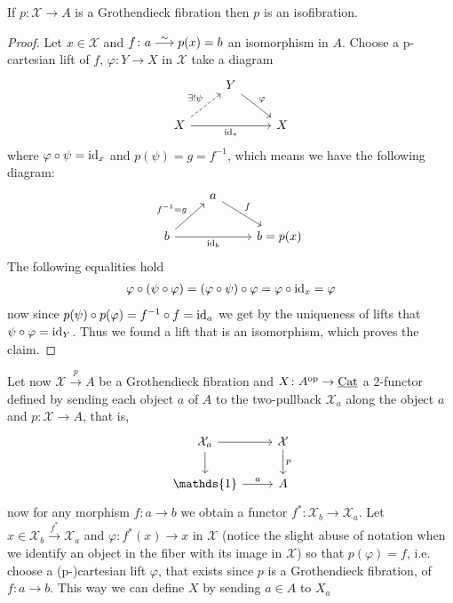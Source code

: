 \begin{lem}
	If $ p \colon \mathcal{ X } \to A $ is a Grothendieck fibration then $ p $ is an isofibration.
\end{lem}

\begin{proof}
	Let $ x \in \mathcal{ X } $ and $ f \colon a \isomorphism p ( x ) = b $ an isomorphism in $ A $.
	Choose a p-cartesian lift of $ f $, $ \varphi \colon Y \to X $ in $ \mathcal{ X } $ take a diagram 
	\[
	\begin{tikzcd}
		&
		Y
		\ar[rd, " \varphi "]
		\\
		X
		\ar[ru, dashed, " \exists ! \psi "]
		\ar[rr, " \id_* "']
		&&
		X
	\end{tikzcd}
	\]
	where $ \varphi \circ \psi = \operatorname{id}_x $ and $ p ( \psi ) = g = f^{-1} $, which means we have the following diagram: 
	\[
	\begin{tikzcd}
		&
		a 
		\ar[rd, " f "]
		\\
		b
		\ar[ru, " f^{ - 1 } = g "]
		\ar[rr, " \id_b"']
		&&
		b = p ( x )
	\end{tikzcd}	
	\]
	The following equalities hold 
	\begin{align*}
		\varphi \circ ( \psi \circ \varphi ) = ( \varphi \circ \psi ) \circ \varphi = \varphi \circ \operatorname{id}_x = \varphi 
	\end{align*}
	now since $ p ( \psi ) \circ p ( \varphi ) =  f^{ - 1 } \circ f = \operatorname{id}_a $
	we get by the uniqueness of lifts that $ \psi \circ \varphi = \operatorname{id}_Y $.
	Thus we found a lift that is an isomorphism, which proves the claim.
\end{proof}

Let now $ \mathcal{ X } \xrightarrow{ p } A $ be a Grothendieck fibration and $ X \colon A^{ \operatorname{op} } \to \underline{\operatorname{Cat}} $ a 2-functor
defined by sending each object  $ a $ of $ A $ to the two-pullback $ \mathcal{ X }_a $ along the object $ a $ and $ p \colon \mathcal{ X } \to A $, that is,
\[
\begin{tikzcd}		
	\mathcal{X}_a 
	\ar[r]
	\ar[d]
	&
	\mathcal{X}
	\ar[d,"p"]
	\\
	\mathds{1}
	\ar[r,"a"]
	&
	A
\end{tikzcd}
\]
now for any morphism $ f \colon a \to b $ we obtain a functor $ f^* \colon \mathcal{ X }_b \to \mathcal{ X }_a $.
Let $ x \in \mathcal{ X }_b \xrightarrow{ f^* } \mathcal{ X }_a $
and $ \varphi \colon f^* ( x ) \to x $ in $ \mathcal{X} $ (notice the slight abuse of notation when we identify an object in the fiber with its image in $ \mathcal{ X } $) so that $ p ( \varphi ) = f $, i.e. choose a (p-)cartesian lift $ \varphi $, that exists since $ p $ is a Grothendieck fibration, of $ f \colon a \to b $.
This way we can define $ X $ by sending $ a \in A $ to $ X_a $ 

